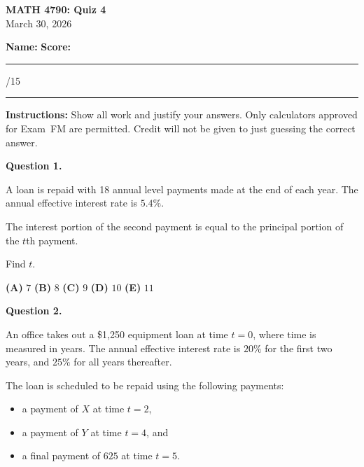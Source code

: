 \documentclass[11pt]{article}
\begin{document}
\begin{center}
    {\Large \textbf{MATH 4790: Quiz 4}}\\[0.3em]
    March 30, 2026
\end{center}

\vspace{1em}

\textbf{Name:} \hfill \textbf{Score:} \rule{1.5cm}{0.4pt}/15

\vspace{1em}

\hrule
\vspace{1em}

\textbf{Instructions:} Show all work and justify your answers. Only calculators approved for Exam~FM are permitted. Credit will not be given to just guessing the correct answer.

\vspace{1em}


\noindent\textbf{Question 1.}  

A loan is repaid with 18 annual level payments made at the end of each year. The annual effective interest rate is $5.4\%$.

The interest portion of the second payment is equal to the principal portion of the $t$th payment.

Find $t$.

\medskip

\begin{center}

\textbf{(A)} $7$
\hspace{1cm}
\textbf{(B)} $8$
\hspace{1cm}
\textbf{(C)} $9$
\hspace{1cm}
\textbf{(D)} $10$
\hspace{1cm}
\textbf{(E)} $11$

\end{center}

\newpage


\noindent\textbf{Question 2.}  

An office takes out a \$1{,}250 equipment loan at time \(t=0\), where time is measured in years. The annual effective interest rate is \(20\%\) for the first two years, and \(25\%\) for all years thereafter.

The loan is scheduled to be repaid using the following payments:
\begin{itemize}[leftmargin=2em]
    \item a payment of \(X\) at time \(t=2\),
    \item a payment of \(Y\) at time \(t=4\), and
    \item a final payment of \(625\) at time \(t=5\).
\end{itemize}
\end{document}
